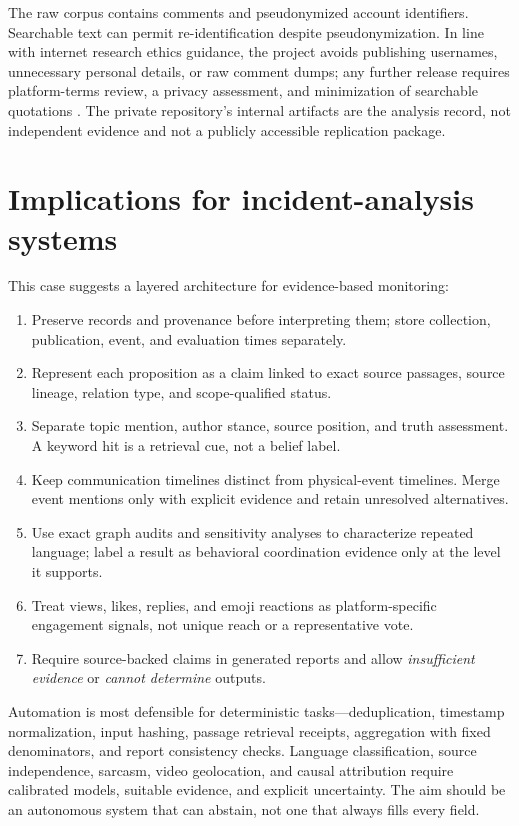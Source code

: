 The raw corpus contains comments and pseudonymized account identifiers. Searchable text can permit re-identification despite pseudonymization. In line with internet research ethics guidance, the project avoids publishing usernames, unnecessary personal details, or raw comment dumps; any further release requires platform-terms review, a privacy assessment, and minimization of searchable quotations \citep{aoir2019ethics}. The private repository's internal artifacts are the analysis record, not independent evidence and not a publicly accessible replication package.

\section{Implications for incident-analysis systems}

This case suggests a layered architecture for evidence-based monitoring:
\begin{enumerate}
\item Preserve records and provenance before interpreting them; store collection, publication, event, and evaluation times separately.
\item Represent each proposition as a claim linked to exact source passages, source lineage, relation type, and scope-qualified status.
\item Separate topic mention, author stance, source position, and truth assessment. A keyword hit is a retrieval cue, not a belief label.
\item Keep communication timelines distinct from physical-event timelines. Merge event mentions only with explicit evidence and retain unresolved alternatives.
\item Use exact graph audits and sensitivity analyses to characterize repeated language; label a result as behavioral coordination evidence only at the level it supports.
\item Treat views, likes, replies, and emoji reactions as platform-specific engagement signals, not unique reach or a representative vote.
\item Require source-backed claims in generated reports and allow \emph{insufficient evidence} or \emph{cannot determine} outputs.
\end{enumerate}

Automation is most defensible for deterministic tasks—deduplication, timestamp normalization, input hashing, passage retrieval receipts, aggregation with fixed denominators, and report consistency checks. Language classification, source independence, sarcasm, video geolocation, and causal attribution require calibrated models, suitable evidence, and explicit uncertainty. The aim should be an autonomous system that can abstain, not one that always fills every field.

